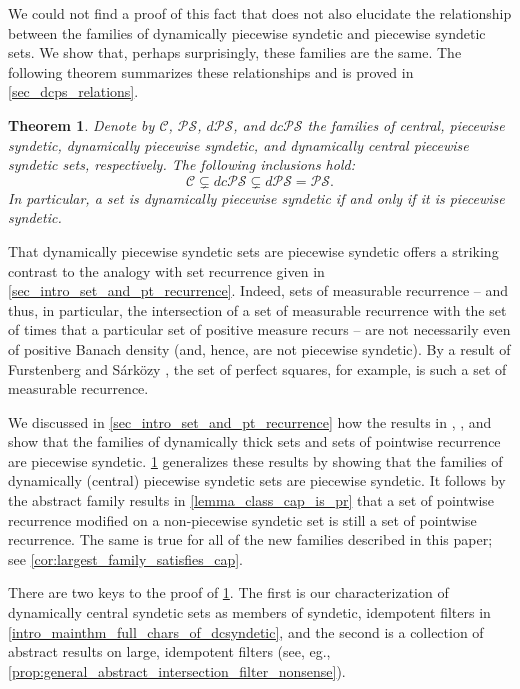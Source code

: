 \documentclass[letter,11pt]{article}
\theoremstyle{plain}
\theoremstyle{definition}
\theoremstyle{plain}
\newcounter{MainTheoremCounter}
\newtheorem{Maintheorem}[MainTheoremCounter]{Theorem}
\theoremstyle{plain}
\numberwithin{equation}{section}
\newcommand{\PS}{\mathcal{PS}}
\newcommand{\dPS}{d\mathcal{PS}}
\newcommand{\dcPS}{dc\mathcal{PS}}
\newcommand{\central}{\mathcal{C}}
\begin{document}
We could not find a proof of this fact that does not also elucidate the relationship between the families of dynamically piecewise syndetic and piecewise syndetic sets.  We show that, perhaps surprisingly, these families are the same.  The following theorem summarizes these relationships and is proved in \cref{sec_dcps_relations}.


\begin{Maintheorem}
\label{thm:relations_C_dPS_PS-intro}
    Denote by $\central$, $\PS$, $\dPS$, and $\dcPS$ the families of central, piecewise syndetic, dynamically piecewise syndetic, and dynamically central piecewise syndetic sets, respectively.  The following inclusions hold:
    \[
        \central \subsetneq \dcPS \subsetneq \dPS = \PS.
    \]
    In particular, a set is dynamically piecewise syndetic if and only if it is piecewise syndetic.
\end{Maintheorem}

That dynamically piecewise syndetic sets are piecewise syndetic offers a striking contrast to the analogy with set recurrence given in \cref{sec_intro_set_and_pt_recurrence}.  Indeed, sets of measurable recurrence -- and thus, in particular, the intersection of a set of measurable recurrence with the set of times that a particular set of positive measure recurs -- are not necessarily even of positive Banach density (and, hence, are not piecewise syndetic).  By a result of Furstenberg \cite{furstenberg_book_1981} and S\'{a}rk\"{o}zy \cite{sarkozy_1978}, the set of perfect squares, for example, is such a set of measurable recurrence.

We discussed in \cref{sec_intro_set_and_pt_recurrence} how the results in \cite[Prop. 4.4]{dong_shao_ye_2012}, \cite{Glasner-Weiss-Interpolation}, and \cite[Thm. 2.4]{huang_ye_2005} show that the families of dynamically thick sets and sets of pointwise recurrence are piecewise syndetic.  \cref{thm:relations_C_dPS_PS-intro} generalizes these results by showing that the families of dynamically (central) piecewise syndetic sets are piecewise syndetic.  It follows by the abstract family results in \cref{lemma_class_cap_is_pr} that a set of pointwise recurrence modified on a non-piecewise syndetic set is still a set of pointwise recurrence.  The same is true for all of the new families described in this paper; see \cref{cor:largest_family_satisfies_cap}.

There are two keys to the proof of \cref{thm:relations_C_dPS_PS-intro}. The first is our characterization of dynamically central syndetic sets as members of syndetic, idempotent filters in \cref{intro_mainthm_full_chars_of_dcsyndetic}, and the second is a collection of abstract results on large, idempotent filters (see, eg., \cref{prop:general_abstract_intersection_filter_nonsense}).
\end{document}
